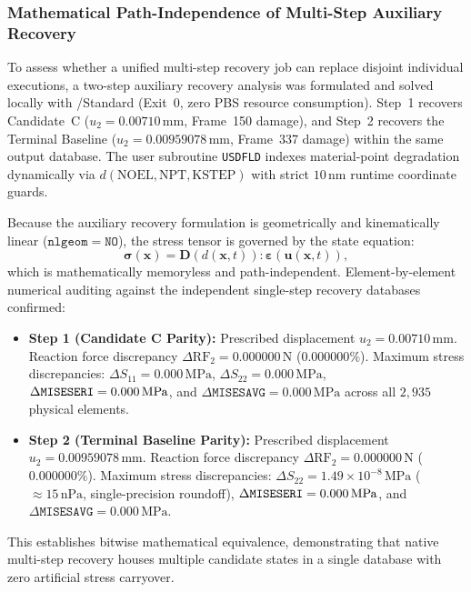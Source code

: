 \subsubsection{Mathematical Path-Independence of Multi-Step Auxiliary Recovery}
To assess whether a unified multi-step recovery job can replace disjoint individual executions, a two-step auxiliary recovery analysis was formulated and solved locally with \Abaqus/Standard (Exit~0, zero PBS resource consumption). Step~1 recovers Candidate~C ($u_2 = 0.00710\,\mathrm{mm}$, Frame~150 damage), and Step~2 recovers the Terminal Baseline ($u_2 = 0.00959078\,\mathrm{mm}$, Frame~337 damage) within the same output database. The user subroutine \texttt{USDFLD} indexes material-point degradation dynamically via $d(\mathrm{NOEL}, \mathrm{NPT}, \mathrm{KSTEP})$ with strict $10\,\mathrm{nm}$ runtime coordinate guards.

Because the auxiliary recovery formulation is geometrically and kinematically linear ($\mathtt{nlgeom=NO}$), the stress tensor is governed by the state equation:
\begin{equation}
  \boldsymbol{\sigma}(\mathbf{x}) = \mathbf{D}(d(\mathbf{x}, t)) : \boldsymbol{\varepsilon}(\mathbf{u}(\mathbf{x}, t)),
\end{equation}
which is mathematically memoryless and path-independent. Element-by-element numerical auditing against the independent single-step recovery databases confirmed:
\begin{itemize}
  \item \textbf{Step 1 (Candidate C Parity):} Prescribed displacement $u_2 = 0.00710\,\mathrm{mm}$. Reaction force discrepancy $\Delta \mathrm{RF}_2 = 0.000000\,\mathrm{N}$ ($0.000000\%$). Maximum stress discrepancies: $\Delta S_{11} = 0.000\,\mathrm{MPa}$, $\Delta S_{22} = 0.000\,\mathrm{MPa}$, $\Delta \texttt{MISESERI} = 0.000\,\mathrm{MPa}$, and $\Delta \texttt{MISESAVG} = 0.000\,\mathrm{MPa}$ across all $2{,}935$ physical elements.
  \item \textbf{Step 2 (Terminal Baseline Parity):} Prescribed displacement $u_2 = 0.00959078\,\mathrm{mm}$. Reaction force discrepancy $\Delta \mathrm{RF}_2 = 0.000000\,\mathrm{N}$ ($0.000000\%$). Maximum stress discrepancies: $\Delta S_{22} = 1.49 \times 10^{-8}\,\mathrm{MPa}$ ($\approx 15\,\mathrm{nPa}$, single-precision roundoff), $\Delta \texttt{MISESERI} = 0.000\,\mathrm{MPa}$, and $\Delta \texttt{MISESAVG} = 0.000\,\mathrm{MPa}$.
\end{itemize}
This establishes bitwise mathematical equivalence, demonstrating that native multi-step recovery houses multiple candidate states in a single database with zero artificial stress carryover.

